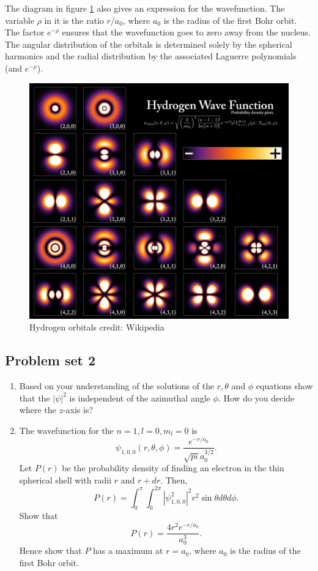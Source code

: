 The diagram in figure \ref{c6f1} also gives an expression for the wavefunction.
The variable $\rho$ in it is the ratio $r/a_0$, where $a_0$ is the radius of the
first Bohr orbit. The factor $e^{-\rho}$ ensures that the wavefunction goes to
zero away from the nucleus. The angular distribution of the orbitals is 
determined solely by the spherical harmonics and the radial distribution by the
associated Laguerre polynomials (and $e^{-\rho}$).
\begin{figure}
\begin{center}
\includegraphics[scale=0.20]{Hydrogen_Density_Plots}
\caption{Hydrogen orbitals credit: Wikipedia}
\label{c6f1}
\end{center}
\end{figure}

\subsection{Problem set 2}
\begin{enumerate}
\item Based on your understanding of the solutions of the $r, \theta$ and 
$\phi$ equations show that the $|\psi|^2$ is independent of the azimuthal angle
$\phi$. How do you decide where the $z$-axis is?
\item The wavefunction for the $n=1, l=0, m_l=0$ is
\begin{equation}\label{c6s3e6}
\psi_{1,0,0}(r,\theta,\phi) = \frac{e^{-r/a_0}}{\sqrt{pi}a_0^{3/2}}.
\end{equation}
Let $P(r)$ be the probability density of finding an electron in the thin 
spherical shell with radii $r$ and $r + dr$. Then,
\begin{equation}\label{c6s3e7}
P(r) = \int_0^{\pi}\int_0^{2\pi}|\psi_{1,0,0}^2|^2r^2\sin\theta d\theta d\phi.
\end{equation}
Show that
\begin{equation}\label{c6s3e8}
P(r) = \frac{4r^2 e^{-r/a_0}}{a_0^3}.
\end{equation}
Hence show that $P$ has a maximum at $r = a_0$, where $a_0$ is the radius of the
first Bohr orbit.
\end{enumerate}
